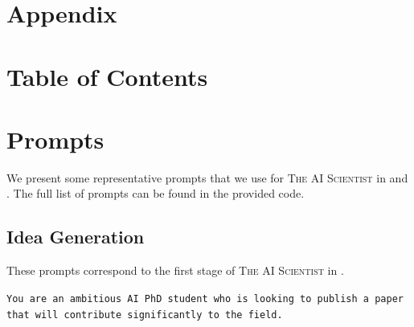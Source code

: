 \documentclass[11pt, a4paper]{include/gdm_format}
\newcommand{\ouralgo}{\textsc{The AI Scientist}\xspace}
\begin{document}
%



\clearpage
\appendix

\section*{\LARGE Appendix}
\vspace*{20pt}
\section*{Table of Contents}
\vspace*{-5pt}
\startcontents[sections]
%

\clearpage
\section{Prompts}
\label{appsec:prompts}
We present some representative prompts that we use for \ouralgo in  and . The full list of prompts can be found in the provided code.

\subsection{Idea Generation}
\label{appsubsec:ideagen_prompts}

These prompts correspond to the first stage of \ouralgo in .

\begin{tcolorbox}[breakable,colback=orange!5!white, colframe=orange!80!black, title=Idea Generation System Prompt]
\texttt{You are an ambitious AI PhD student who is looking to publish a paper that will contribute significantly to the field.}
\end{tcolorbox}
\end{document}
